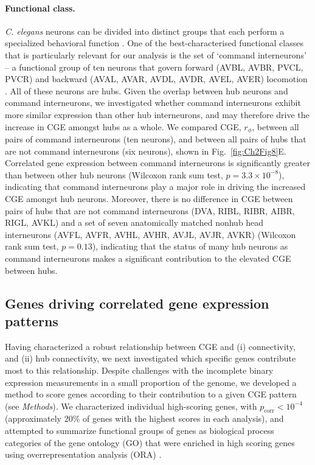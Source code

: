 {\paragraph{Functional class.}
\emph{C. elegans} neurons can be divided into distinct groups that each perform a specialized behavioral function \citep{Hobert2003}.
One of the best-characterised functional classes that is particularly relevant for our analysis is the set of `command interneurons' -- a functional group of ten neurons that govern forward (AVBL, AVBR, PVCL, PVCR) and backward (AVAL, AVAR, AVDL, AVDR, AVEL, AVER) locomotion \citep{Rakowski2013}.
All of these neurons are hubs.
Given the overlap between hub neurons and command interneurons, we investigated whether command interneurons exhibit more similar expression than other hub interneurons, and may therefore drive the increase in CGE amongst hubs as a whole.
We compared CGE, $r_\phi$, between all pairs of command interneurons (ten neurons), and between all pairs of hubs that are not command interneurons (six neurons), shown in Fig.~\ref{fig:Ch2Fig8}E.
Correlated gene expression between command interneurons is significantly greater than between other hub neurons (Wilcoxon rank sum test, $p = 3.3 \times 10^{-8}$), indicating that command interneurons play a major role in driving the increased CGE amongst hub neurons.
Moreover, there is no difference in CGE between pairs of hubs that are not command interneurons (DVA, RIBL, RIBR, AIBR, RIGL, AVKL) and a set of seven anatomically matched nonhub head interneurons (AVFL, AVFR, AVHL, AVHR, AVJL, AVJR, AVKR) (Wilcoxon rank sum test, $p = 0.13$), indicating that the status of many hub neurons as command interneurons makes a significant contribution to the elevated CGE between hubs.

\subsection{Genes driving correlated gene expression patterns}

Having characterized a robust relationship between CGE and (i) connectivity, and (ii) hub connectivity, we next investigated which specific genes contribute most to this relationship.
Despite challenges with the incomplete binary expression measurements in a small proportion of the genome, we developed a method to score genes according to their contribution to a given CGE pattern (see \emph{Methods}).
We characterized individual high-scoring genes, with $p_\mathrm{corr} < 10^{-4}$ (approximately 20\% of genes with the highest scores in each analysis), and attempted to summarize functional groups of genes as biological process categories of the gene ontology (GO) that were enriched in high scoring genes using overrepresentation analysis (ORA) \citep{Ashburner2000, Gillis2010}.

}
